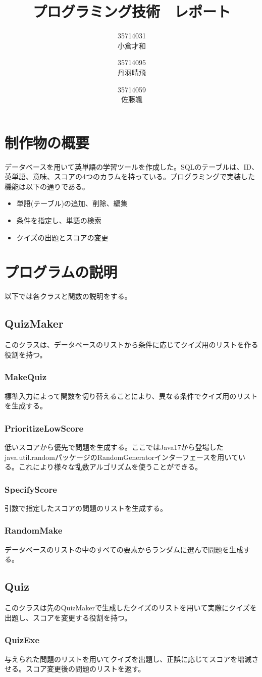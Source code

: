 \documentclass{ltjsarticle}
\title{プログラミング技術　レポート}
\author{35714031 \\ 小倉才和 \and 35714095 \\ 丹羽晴飛 \and 35714059 \\ 佐藤颯}
\date{\empty}
\begin{document}
\maketitle
\section{制作物の概要}
データベースを用いて英単語の学習ツールを作成した。SQLのテーブルは、ID、英単語、意味、スコアの4つのカラムを持っている。プログラミングで実装した機能は以下の通りである。
\begin{itemize}
    \item 単語(テーブル)の追加、削除、編集
    \item 条件を指定し、単語の検索
    \item クイズの出題とスコアの変更
\end{itemize}

\section{プログラムの説明}
以下では各クラスと関数の説明をする。
\subsection{QuizMaker}
このクラスは、データベースのリストから条件に応じてクイズ用のリストを作る役割を持つ。
\subsubsection{MakeQuiz}
標準入力によって関数を切り替えることにより、異なる条件でクイズ用のリストを生成する。
\subsubsection{PrioritizeLowScore}
低いスコアから優先で問題を生成する。ここではJava17から登場したjava.util.randomパッケージのRandomGeneratorインターフェースを用いている。これにより様々な乱数アルゴリズムを使うことができる。
\subsubsection{SpecifyScore}
引数で指定したスコアの問題のリストを生成する。
\subsubsection{RandomMake}
データベースのリストの中のすべての要素からランダムに選んで問題を生成する。

\subsection{Quiz}
このクラスは先のQuizMakerで生成したクイズのリストを用いて実際にクイズを出題し、スコアを変更する役割を持つ。
\subsubsection{QuizExe}
与えられた問題のリストを用いてクイズを出題し、正誤に応じてスコアを増減させる。スコア変更後の問題のリストを返す。
\end{document}
